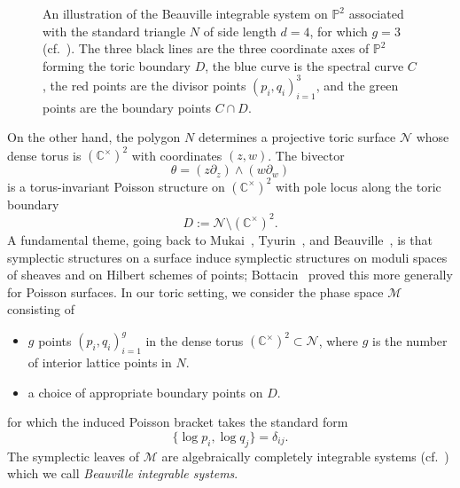 \documentclass[dvipsnames,11pt]{article}
\theoremstyle{definition}
\newcommand{\C}{{\mathbb C}}
\renewcommand{\P}{{\mathbb P}}
\begin{document}
\begin{figure}
\begin{center}


\end{center}
\caption{An illustration of the Beauville integrable system on $\P^2$ associated with the standard triangle $N$ of side length $d=4$, for which $g=3$ (cf.~\cite{OkounkovTalk}). The three black lines are the three coordinate axes of $\P^2$ forming the toric boundary $D$, the blue curve is the spectral curve $C$, the red points are the divisor points $(p_i,q_i)_{i=1}^3$, and the green points are the boundary points $C\cap D$.} \label{Fig:beauville}
\end{figure}

On the other hand, the polygon $N$ determines a projective toric surface $\mathcal N$ whose dense torus is $(\C^\times)^2$ with coordinates $(z,w)$. The bivector
\[
\theta = (z\partial_z)\wedge (w\partial_w)
\]
is a torus-invariant Poisson structure on $(\C^\times)^2$ with pole locus along the toric boundary
\[
D:=\mathcal N\setminus (\C^\times)^2.
\]
A fundamental theme, going back to Mukai~\cite{Mukai}, Tyurin~\cite{Tyurin}, and Beauville~\cite{Beauville}, is that symplectic structures on a surface induce symplectic structures on moduli spaces of sheaves and on Hilbert schemes of points; Bottacin~\cite{Bottacin, Bott1} proved this more generally for Poisson surfaces. In our toric setting, we consider the phase space $\mathcal M$ consisting of
\begin{itemize}
\item $g$ points $(p_i,q_i)_{i=1}^g$ in the dense torus $(\C^\times)^2\subset \mathcal N$, where $g$ is the number of interior lattice points in $N$. 
\item a choice of appropriate boundary points on $D$.
\end{itemize}
for which the induced Poisson bracket takes the standard form
\[
\{\log p_i,\log q_j\}=\delta_{ij}.
\]
The symplectic leaves of $\mathcal M$ are algebraically completely integrable systems (cf.~\cite{Beauville,Bottacin,Bott1}) which we call \emph{Beauville integrable systems}.
\end{document}
